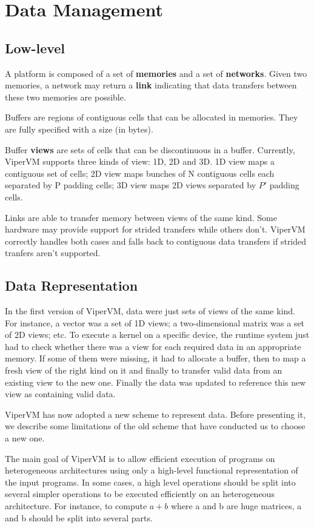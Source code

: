 \chapter{Data Management}

\section{Low-level}
A platform is composed of a set of \textbf{memories} and a set of
\textbf{networks}. Given two memories, a network may return a \textbf{link}
indicating that data transfers between these two memories are possible.

Buffers are regions of contiguous cells that can be allocated in memories. They
are fully specified with a size (in bytes).

Buffer \textbf{views} are sets of cells that can be discontinuous in a buffer.
Currently, ViperVM supports three kinds of view: 1D, 2D and 3D. 1D view maps a
contiguous set of cells; 2D view maps bunches of N contiguous cells each
separated by P padding cells; 3D view maps 2D views separated by $P'$ padding
cells.

Links are able to transfer memory between views of the same kind. Some hardware
may provide support for strided transfers while others don't. ViperVM correctly
handles both cases and falls back to contiguous data transfers if strided
tranfers aren't supported.

\section{Data Representation}
In the first version of ViperVM, data were just sets of views of the same kind.
For instance, a vector was a set of 1D views; a two-dimensional matrix was a set
of 2D views; etc. To execute a kernel on a specific device, the runtime system
just had to check whether there was a view for each required data in an
appropriate memory. If some of them were missing, it had to allocate a buffer,
then to map a fresh view of the right kind on it and finally to transfer valid data
from an existing view to the new one. Finally the data was updated to reference
this new view as containing valid data.

ViperVM has now adopted a new scheme to represent data. Before presenting it, we
describe some limitations of the old scheme that have conducted us to choose a
new one.

The main goal of ViperVM is to allow efficient execution of programs on
heterogeneous architectures using only a high-level functional representation of
the input programs. In some cases, a high level operations should be split into
several simpler operations to be executed efficiently on an heterogeneous
architecture. For instance, to compute $a+b$ where a and b are huge matrices, a
and b should be split into several parts.

